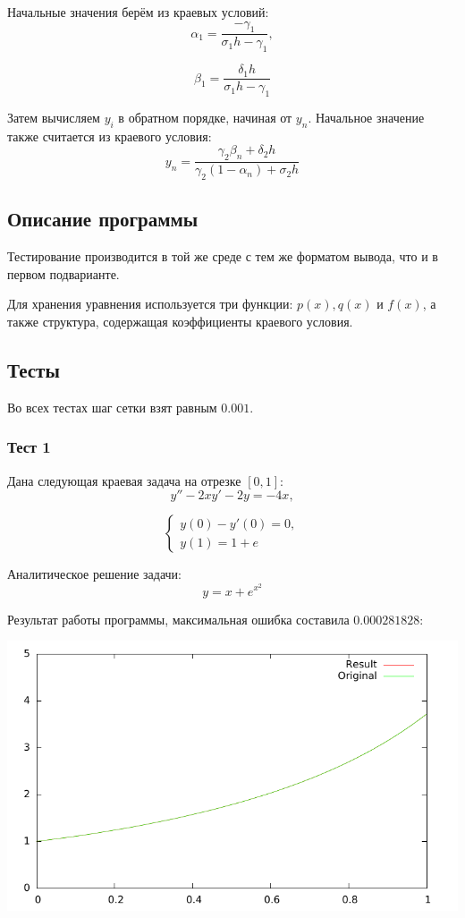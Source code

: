 \documentclass[a4paper,11pt]{report}
\begin{document}
Начальные значения берём из краевых условий:
$$
\alpha_1 = \frac{-\gamma_1}{\sigma_1 h - \gamma_1},
$$

$$
\beta_1 = \frac{\delta_1 h}{\sigma_1 h - \gamma_1}
$$

Затем вычисляем $y_i$ в обратном порядке, начиная от $y_n$. Начальное значение также считается
из краевого условия:
$$
y_n = \frac{\gamma_2 \beta_n + \delta_2 h}{\gamma_2 (1 - \alpha_n) + \sigma_2 h}
$$

\subsection*{Описание программы}

Тестирование производится в той же среде с тем же форматом вывода, что и в первом подварианте.

Для хранения уравнения используется три функции: $p(x), q(x)$ и $f(x)$, а также структура, содержащая
коэффициенты краевого условия.

\subsection*{Тесты}

Во всех тестах шаг сетки взят равным $0.001$.

\subsubsection*{Тест 1}

Дана следующая краевая задача на отрезке $[0, 1]$:
$$
y'' - 2xy' - 2y = -4x,
$$

$$
\begin{cases}
 y(0) - y'(0) = 0, \\
 y(1) = 1 + e
\end{cases}
$$

Аналитическое решение задачи:
$$
y = x + e^{x^2}
$$

Результат работы программы, максимальная ошибка составила $0.000281828$:

\includegraphics{../plots/btest1.pdf}
\end{document}
